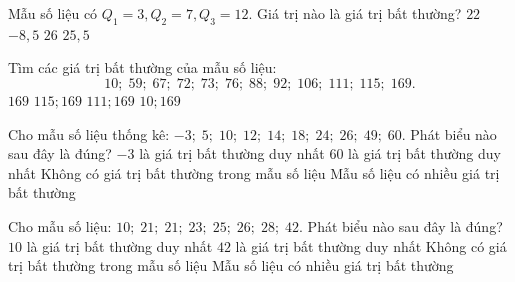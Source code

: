 \begin{ex}
	Mẫu số liệu có $Q_1 = 3, Q_2 = 7, Q_3 = 12$. Giá trị nào là giá trị bất thường?
	\choice
	{$22$}
	{$-8{,}5$}
	{\True $26$}
	{$25{,}5$}
\end{ex}

\begin{ex}
	Tìm các giá trị bất thường của mẫu số liệu:
	\[10;\; 59;\; 67;\; 72;\; 73;\; 76;\; 88;\; 92;\; 106;\; 111;\; 115;\; 169.\]
	\choice
	{$169$}
	{$115; 169$}
	{$111; 169$}
	{\True $10; 169$}
\end{ex}

\begin{ex}
	Cho mẫu số liệu thống kê: $-3;\; 5;\; 10;\; 12;\; 14;\; 18;\; 24;\; 26;\; 49;\; 60$. Phát biểu nào sau đây là đúng?
	\choice
	{$-3$ là giá trị bất thường duy nhất}
	{\True $60$ là giá trị bất thường duy nhất}
	{Không có giá trị bất thường trong mẫu số liệu}
	{Mẫu số liệu có nhiều giá trị bất thường}
\end{ex}

\begin{ex}
	Cho mẫu số liệu: $10;\; 21;\; 21;\; 23;\; 25;\; 26;\; 28;\; 42$. Phát biểu nào sau đây là đúng?
	\choice
	{$10$ là giá trị bất thường duy nhất}
	{$42$ là giá trị bất thường duy nhất}
	{\True Không có giá trị bất thường trong mẫu số liệu}
	{Mẫu số liệu có nhiều giá trị bất thường}
\end{ex}


